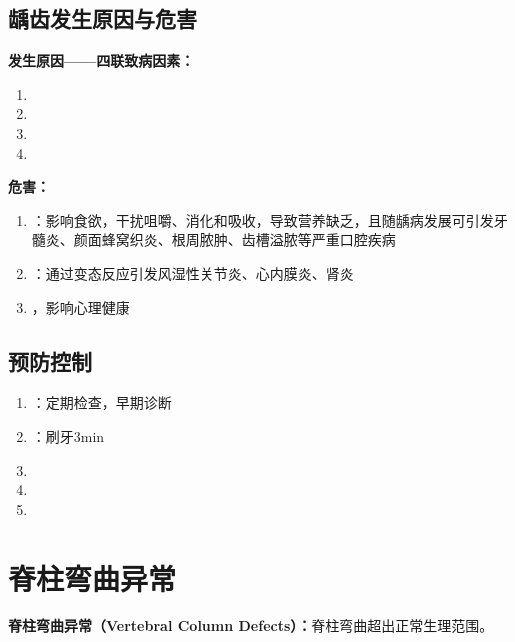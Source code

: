 \subsection{龋齿发生原因与危害}

\begin{keybox}
\textbf{发生原因——四联致病因素：}
\begin{enumerate}[leftmargin=*]
    \item {}
    \item {}
    \item {}
    \item {}
\end{enumerate}

\textbf{危害：}
\begin{enumerate}[leftmargin=*]
    \item {}：影响食欲，干扰咀嚼、消化和吸收，导致营养缺乏，且随龋病发展可引发牙髓炎、颜面蜂窝织炎、根周脓肿、齿槽溢脓等严重口腔疾病
    \item {}：通过变态反应引发风湿性关节炎、心内膜炎、肾炎
    \item {}，影响心理健康
\end{enumerate}
\end{keybox}

\subsection{预防控制}

\begin{keybox}
\begin{enumerate}[leftmargin=*]
    \item {}：定期检查，早期诊断
    \item {}：刷牙3min
    \item {}
    \item {}
    \item {}
\end{enumerate}
\end{keybox}

\section{脊柱弯曲异常}

\begin{defbox}
\textbf{脊柱弯曲异常（Vertebral Column Defects）：}脊柱弯曲超出正常生理范围。
\end{defbox}

